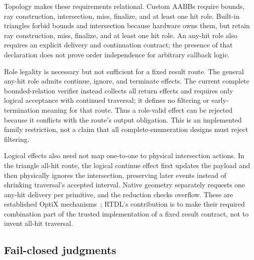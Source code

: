 \documentclass[sigplan,screen,review,anonymous]{acmart}
\newcommand{\rtdl}{\textsc{RTDL}\xspace}
\begin{document}
Topology makes these requirements relational. Custom AABBs require bounds,
ray construction, intersection, miss, finalize, and at least one hit role.
Built-in triangles forbid bounds and intersection because hardware owns them,
but retain ray construction, miss, finalize, and at least one hit role. An
any-hit role also requires an explicit delivery and continuation contract; the
presence of that declaration does not prove order independence for arbitrary
callback logic.

Role legality is necessary but not sufficient for a fixed result route. The
general any-hit role admits continue, ignore, and terminate effects. The
current complete bounded-relation verifier instead collects all return effects
and requires only logical acceptance with continued traversal; it defines no
filtering or early-termination meaning
for that route. Thus a role-valid effect can be rejected because it conflicts
with the route's output obligation. This is an implemented family restriction,
not a claim that all complete-enumeration designs must reject filtering.

Logical effects also need not map one-to-one to physical intersection actions.
In the triangle all-hit route, the logical continue effect first updates the
payload and then physically ignores the intersection, preserving later
events instead of shrinking traversal's accepted interval. Native geometry
separately requests one any-hit delivery per primitive, and the reduction checks
overflow. These are established OptiX mechanisms~\cite{nvidiaOptix9Guide};
\rtdl's contribution is to
make their required combination part of the trusted implementation of a fixed
result contract, not to invent all-hit traversal.

\subsection{Fail-closed judgments}
\end{document}
